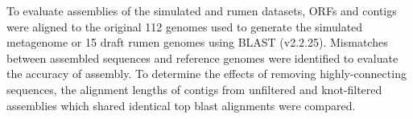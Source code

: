 \documentclass[11pt]{article} %
\begin{document}
To evaluate assemblies of the simulated and rumen datasets, ORFs and contigs were aligned to the original 112 genomes used to generate the simulated metagenome or 15 draft rumen genomes  \cite{Hess:2011p686} using BLAST (v2.2.25).   Mismatches between assembled sequences and reference genomes were identified to evaluate the accuracy of assembly.  To determine the effects of removing highly-connecting sequences, the alignment lengths of contigs from unfiltered and knot-filtered assemblies which shared identical top blast alignments were compared.    




\end{document}
